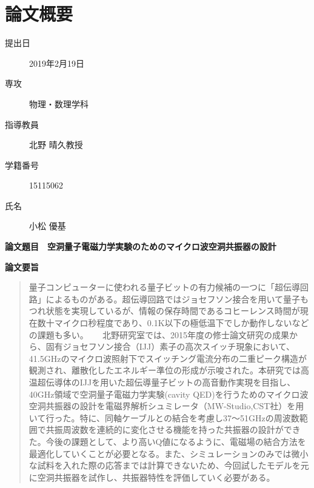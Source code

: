\chapter*{論文概要}
\thispagestyle{empty}

\begin{description}
  \item[提出日] 2019年2月19日
  \item[専攻] 物理・数理学科
  \item[指導教員] 北野 晴久教授
  \item[学籍番号] 15115062
  \item[氏名] 小松 優基
\end{description}
\textbf{論文題目}　\textbf{空洞量子電磁力学実験のためのマイクロ波空洞共振器の設計}\\
\thispagestyle{empty}

\textbf{論文要旨}

\begin{abstract}
量子コンピューターに使われる量子ビットの有力候補の一つに「超伝導回路」によるものがある。超伝導回路ではジョセフソン接合を用いて量子もつれ状態を実現しているが、情報の保存時間であるコヒーレンス時間が現在数十マイクロ秒程度であり、0.1K以下の極低温下でしか動作しないなどの課題も多い。
　
北野研究室では、2015年度の修士論文研究の成果から、固有ジョセフソン接合（IJJ）素子の高次スイッチ現象において、41.5GHzのマイクロ波照射下でスイッチング電流分布の二重ピーク構造が観測され、離散化したエネルギー準位の形成が示唆された。本研究では高温超伝導体のIJJを用いた超伝導量子ビットの高音動作実現を目指し、40GHz領域で空洞量子電磁力学実験(cavity QED)を行うためのマイクロ波空洞共振器の設計を電磁界解析シュミレータ（MW-Studio,CST社）を用いて行った。特に、同軸ケーブルとの結合を考慮し37〜51GHzの周波数範囲で共振周波数を連続的に変化させる機能を持った共振器の設計ができた。今後の課題として、より高いQ値になるように、電磁場の結合方法を最適化していくことが必要となる。また、シミュレーションのみでは微小な試料を入れた際の応答までは計算できないため、今回試したモデルを元に空洞共振器を試作し、共振器特性を評価していく必要がある。
\end{abstract}
